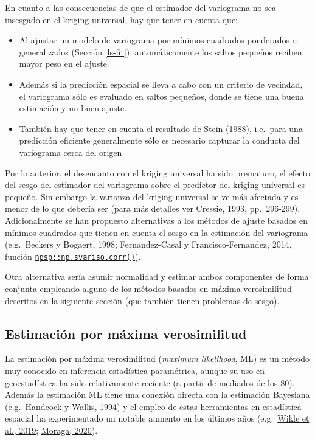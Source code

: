 \documentclass[
]{book}
\providecommand{\tightlist}{%
  \setlength{\itemsep}{0pt}\setlength{\parskip}{0pt}}
\theoremstyle{break}
\theoremstyle{definition}
\theoremstyle{definition}
\theoremstyle{definition}
\theoremstyle{definition}
\theoremstyle{remark}
\begin{document}
En cuanto a las consecuencias de que el estimador del variograma no sea insesgado en el kriging universal, hay que tener en cuenta que:

\begin{itemize}
\tightlist
\item
  Al ajustar un modelo de variograma por mínimos cuadrados ponderados o generalizados (Sección \ref{ls-fit}), automáticamente los saltos pequeños reciben mayor peso en el ajuste.
\item
  Además si la predicción espacial se lleva a cabo con un criterio de vecindad, el variograma sólo es evaluado en saltos pequeños, donde se tiene una buena estimación y un buen ajuste.
\item
  También hay que tener en cuenta el resultado de Stein (1988), i.e.~para una predicción eficiente generalmente sólo es necesario capturar la conducta del variograma cerca del origen
\end{itemize}

Por lo anterior, el desencanto con el kriging universal ha sido prematuro, el efecto del sesgo del estimador del variograma sobre el predictor del kriging universal es pequeño.
Sin embargo la varianza del kriging universal se ve más afectada y es menor de lo que debería ser (para más detalles ver Cressie, 1993, pp.~296-299).
Adicionalmente se han propuesto alternativas a los métodos de ajuste basados en mínimos cuadrados que tienen en cuenta el sesgo en la estimación del variograma (e.g.~Beckers y Bogaert, 1998; Fernandez-Casal y Francisco-Fernandez, 2014, función \href{https://rubenfcasal.github.io/npsp/reference/np.svar.html}{\texttt{npsp::np.svariso.corr()}}).

Otra alternativa sería asumir normalidad y estimar ambos componentes de forma conjunta empleando alguno de los métodos basados en máxima verosimilitud descritos en la siguiente sección (que también tienen problemas de sesgo).

\subsection{Estimación por máxima verosimilitud}\label{ml-fit}

La estimación por máxima verosimilitud (\emph{maximum likelihood}, ML) es un método muy conocido en inferencia estadística paramétrica, aunque su uso en geoestadística ha sido relativamente reciente (a partir de mediados de los 80).
Además la estimación ML tiene una conexión directa con la estimación Bayesiana (e.g.~Handcock y Wallis, 1994) y el empleo de estas herramientas en estadística espacial ha experimentado un notable aumento en los últimos años (e.g.~\href{https://spacetimewithr.org/}{Wikle et al., 2019}; \href{https://www.paulamoraga.com/book-geospatial/}{Moraga, 2020}).
\end{document}
